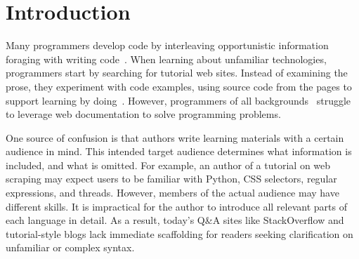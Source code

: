 \section{Introduction}

Many programmers develop code by interleaving opportunistic information foraging with writing code~\cite{brandt_two_2009,brandt_example-centric_2010}.
When learning about unfamiliar technologies, programmers start by searching for tutorial web sites.
Instead of examining the prose, they experiment with code examples, using source code from the pages to support learning by doing~\cite{brandt_two_2009}.
However, programmers of all backgrounds~\cite{duala-ekoko_asking_2012,dorn_lost_2013,dorn_learning_2010} struggle to leverage web documentation to solve programming problems.

One source of confusion is that authors write learning materials with a certain audience in mind.
This intended target audience determines what information is included, and what is omitted.
For example, an author of a tutorial on web scraping may expect users to be familiar with Python, CSS selectors, regular expressions, and threads.
However, members of the actual audience may have different skills.
It is impractical for the author to introduce all relevant parts of each language in detail.
As a result, today's Q\&A sites like StackOverflow and tutorial-style blogs lack immediate scaffolding for readers seeking clarification on unfamiliar or complex syntax. 

